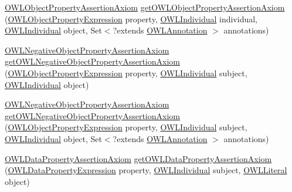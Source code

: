 \begin{DoxyCompactItemize}
\item 
\hyperlink{interfaceorg_1_1semanticweb_1_1owlapi_1_1model_1_1_o_w_l_object_property_assertion_axiom}{O\-W\-L\-Object\-Property\-Assertion\-Axiom} \hyperlink{interfaceorg_1_1semanticweb_1_1owlapi_1_1model_1_1_o_w_l_data_factory_ae28747f1e16d4be4c7019d0c297dce16}{get\-O\-W\-L\-Object\-Property\-Assertion\-Axiom} (\hyperlink{interfaceorg_1_1semanticweb_1_1owlapi_1_1model_1_1_o_w_l_object_property_expression}{O\-W\-L\-Object\-Property\-Expression} property, \hyperlink{interfaceorg_1_1semanticweb_1_1owlapi_1_1model_1_1_o_w_l_individual}{O\-W\-L\-Individual} individual, \hyperlink{interfaceorg_1_1semanticweb_1_1owlapi_1_1model_1_1_o_w_l_individual}{O\-W\-L\-Individual} object, Set$<$?extends \hyperlink{interfaceorg_1_1semanticweb_1_1owlapi_1_1model_1_1_o_w_l_annotation}{O\-W\-L\-Annotation} $>$ annotations)
\item 
\hyperlink{interfaceorg_1_1semanticweb_1_1owlapi_1_1model_1_1_o_w_l_negative_object_property_assertion_axiom}{O\-W\-L\-Negative\-Object\-Property\-Assertion\-Axiom} \hyperlink{interfaceorg_1_1semanticweb_1_1owlapi_1_1model_1_1_o_w_l_data_factory_a16ab76ac6ecd9848b168e87b6e6b17ce}{get\-O\-W\-L\-Negative\-Object\-Property\-Assertion\-Axiom} (\hyperlink{interfaceorg_1_1semanticweb_1_1owlapi_1_1model_1_1_o_w_l_object_property_expression}{O\-W\-L\-Object\-Property\-Expression} property, \hyperlink{interfaceorg_1_1semanticweb_1_1owlapi_1_1model_1_1_o_w_l_individual}{O\-W\-L\-Individual} subject, \hyperlink{interfaceorg_1_1semanticweb_1_1owlapi_1_1model_1_1_o_w_l_individual}{O\-W\-L\-Individual} object)
\item 
\hyperlink{interfaceorg_1_1semanticweb_1_1owlapi_1_1model_1_1_o_w_l_negative_object_property_assertion_axiom}{O\-W\-L\-Negative\-Object\-Property\-Assertion\-Axiom} \hyperlink{interfaceorg_1_1semanticweb_1_1owlapi_1_1model_1_1_o_w_l_data_factory_ab5c34e4fb06f07c6491bd07af2bc3af2}{get\-O\-W\-L\-Negative\-Object\-Property\-Assertion\-Axiom} (\hyperlink{interfaceorg_1_1semanticweb_1_1owlapi_1_1model_1_1_o_w_l_object_property_expression}{O\-W\-L\-Object\-Property\-Expression} property, \hyperlink{interfaceorg_1_1semanticweb_1_1owlapi_1_1model_1_1_o_w_l_individual}{O\-W\-L\-Individual} subject, \hyperlink{interfaceorg_1_1semanticweb_1_1owlapi_1_1model_1_1_o_w_l_individual}{O\-W\-L\-Individual} object, Set$<$?extends \hyperlink{interfaceorg_1_1semanticweb_1_1owlapi_1_1model_1_1_o_w_l_annotation}{O\-W\-L\-Annotation} $>$ annotations)
\item 
\hyperlink{interfaceorg_1_1semanticweb_1_1owlapi_1_1model_1_1_o_w_l_data_property_assertion_axiom}{O\-W\-L\-Data\-Property\-Assertion\-Axiom} \hyperlink{interfaceorg_1_1semanticweb_1_1owlapi_1_1model_1_1_o_w_l_data_factory_ac8e88bf2ba7d6da063983233ba6c167f}{get\-O\-W\-L\-Data\-Property\-Assertion\-Axiom} (\hyperlink{interfaceorg_1_1semanticweb_1_1owlapi_1_1model_1_1_o_w_l_data_property_expression}{O\-W\-L\-Data\-Property\-Expression} property, \hyperlink{interfaceorg_1_1semanticweb_1_1owlapi_1_1model_1_1_o_w_l_individual}{O\-W\-L\-Individual} subject, \hyperlink{interfaceorg_1_1semanticweb_1_1owlapi_1_1model_1_1_o_w_l_literal}{O\-W\-L\-Literal} object)

\end{DoxyCompactItemize}
